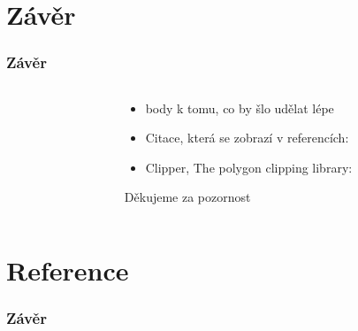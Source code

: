\documentclass[notes=false,pdftex]{beamer}
\begin{document}
\section{Závěr}
\begin{frame}
	\frametitle{Závěr}

	\begin{columns}[T]
		\begin{column}{0.5\textwidth}
		\end{column}
		\begin{column}{0.5\textwidth}
			\begin{itemize}
				\item body k tomu, co by šlo udělat lépe\pause
				\item Citace, která se zobrazí v referencích: \cite{Wurm2008Coordinated}
				\item Clipper, The polygon clipping library: \cite{VattiBalaPolygonClipping}
			\end{itemize}
			\pause
			\vspace{13ex}\hspace*{\fill}Děkujeme za pozornost
		\end{column}
	\end{columns}

\end{frame}

\section{Reference}
\begin{frame}
	\frametitle{Závěr}

	
	
	
\end{frame}
\end{document}
